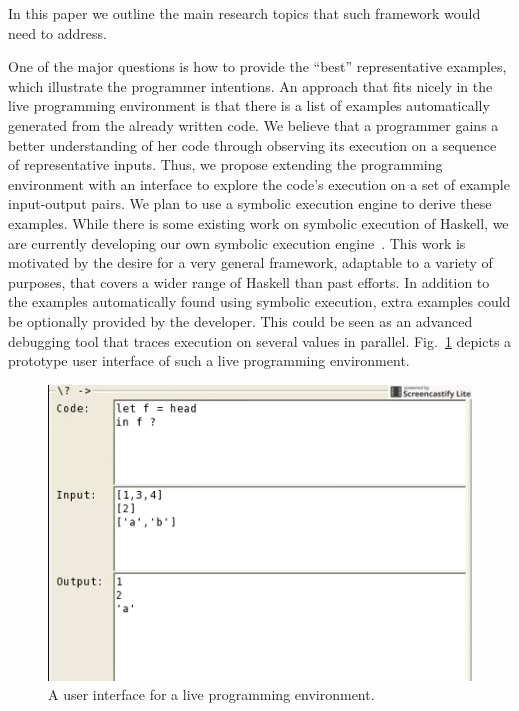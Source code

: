 \noindent{}

In this paper we outline the main research topics that such framework would need to address. 

One of the major questions is how to provide the ``best'' representative examples, 
which illustrate the programmer intentions. An approach that fits nicely
in the live programming environment is that there is a list of examples automatically
generated from the already written code. We believe that a programmer gains a better understanding of her code through observing its execution on a sequence of representative inputs. Thus, we propose extending the programming environment with an interface to explore the code's execution on a set of example input-output pairs. We plan to use a symbolic execution engine to derive these examples.  While there is some existing work on symbolic execution of Haskell, we are currently developing our own symbolic execution engine~\cite{contract, HallahanTAPAS17}.  This work is motivated by the desire for a very general framework, adaptable to a variety of purposes,  that covers a wider range of Haskell than past efforts.
In addition to the examples automatically found using symbolic execution, extra examples could be optionally provided by the developer. This could be seen as an advanced debugging tool that traces execution on several values in parallel. Fig.~\ref{fig:tool} depicts a prototype user interface of such a live programming environment.

\begin{figure}[h!]
\centering
\includegraphics[scale=0.5]{tool}
\caption{A user interface for a live programming environment.}
\label{fig:tool}
\end{figure}

